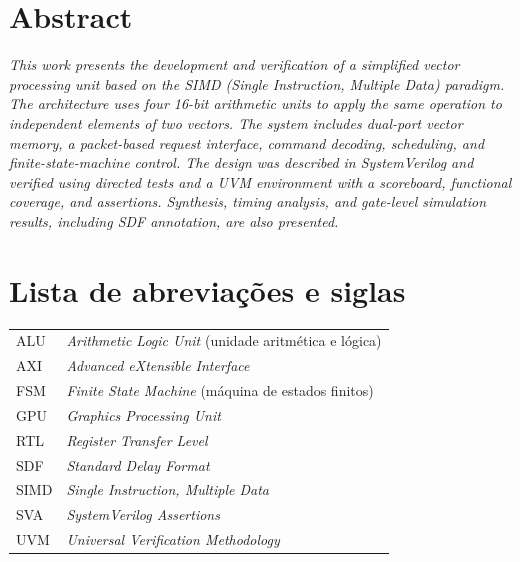 \documentclass[10pt,a4paper]{article}
\begin{document}
\section*{Abstract}
\textit{This work presents the development and verification of a simplified vector processing unit based on the SIMD (Single Instruction, Multiple Data) paradigm. The architecture uses four 16-bit arithmetic units to apply the same operation to independent elements of two vectors. The system includes dual-port vector memory, a packet-based request interface, command decoding, scheduling, and finite-state-machine control. The design was described in SystemVerilog and verified using directed tests and a UVM environment with a scoreboard, functional coverage, and assertions. Synthesis, timing analysis, and gate-level simulation results, including SDF annotation, are also presented.}

\vspace{0.5em}
\section*{Lista de abreviações e siglas}
\begin{tabularx}{\textwidth}{@{}lY@{}}
ALU & \textit{Arithmetic Logic Unit} (unidade aritmética e lógica)\\
AXI & \textit{Advanced eXtensible Interface}\\
FSM & \textit{Finite State Machine} (máquina de estados finitos)\\
GPU & \textit{Graphics Processing Unit}\\
RTL & \textit{Register Transfer Level}\\
SDF & \textit{Standard Delay Format}\\
SIMD & \textit{Single Instruction, Multiple Data}\\
SVA & \textit{SystemVerilog Assertions}\\
UVM & \textit{Universal Verification Methodology}
\end{tabularx}

\clearpage
\tableofcontents


\clearpage
{}

\end{document}
